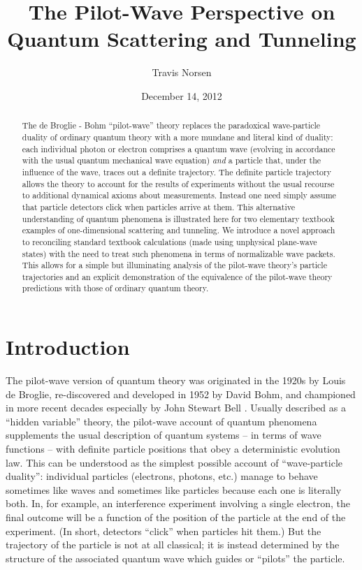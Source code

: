 \documentclass[aps,prc,onecolumn,letterpaper,floatfix,12pt]{revtex4}
\begin{document}
\title{The Pilot-Wave Perspective on Quantum Scattering and Tunneling}
\author{Travis Norsen}

\date{December 14, 2012}

\begin{abstract}
The de Broglie - Bohm ``pilot-wave'' theory replaces the paradoxical
wave-particle duality of ordinary quantum theory with a more mundane
and literal kind of duality:  each individual photon or electron comprises
a quantum wave (evolving in accordance with the usual quantum mechanical wave
equation) \emph{and} a particle that, under the influence of the wave, 
traces out a definite trajectory.  The definite particle trajectory
allows the theory to account for the results of experiments without
the usual recourse to additional dynamical axioms about measurements.
Instead one need simply assume that particle detectors click when particles
arrive at them.  This alternative understanding of
quantum phenomena is illustrated here for two elementary textbook
examples of one-dimensional scattering and tunneling.  We introduce a novel
approach to reconciling standard textbook calculations (made using
unphysical plane-wave states) with the need
to treat such phenomena in terms of normalizable wave packets.  This
allows for a simple but illuminating analysis of the pilot-wave
theory's particle trajectories and an explicit demonstration of the
equivalence of the pilot-wave theory
predictions with those of ordinary quantum theory.  
\end{abstract}

\maketitle


\section{Introduction}

The pilot-wave version of quantum theory was originated in the
1920s by Louis de Broglie, re-discovered and developed in 1952 by
David Bohm, and championed in more recent decades especially by John
Stewart Bell \cite{dbb}.  Usually described as a ``hidden variable'' theory, the
pilot-wave account of quantum phenomena supplements the usual
description of quantum systems -- in terms of wave functions -- with
definite particle positions that obey a deterministic evolution law.
This can be understood as the simplest possible account of
``wave-particle duality'':  individual particles (electrons,
photons, etc.) manage to behave sometimes like waves and sometimes
like particles because each one is literally both.  In, for example,
an interference experiment involving a single electron, the final
outcome will be a function of the position of the particle at the end
of the experiment.  (In short, detectors ``click'' when particles hit them.)
But the trajectory of the particle is not at all classical; it
is instead determined by the structure of the associated quantum wave
which guides or ``pilots'' the particle.
\end{document}
